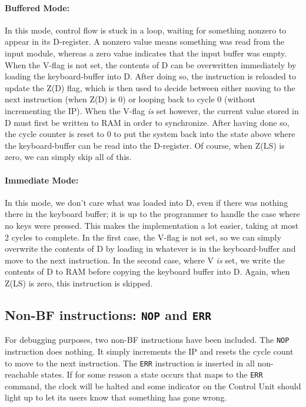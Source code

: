 \paragraph{Buffered Mode:}
In this mode, control flow is stuck in a loop, waiting for something nonzero to appear in its D-register. A nonzero value means something was read from the input module, whereas a zero value indicates that the input buffer was empty. When the V-flag is not set, the contents of D can be overwritten immediately by loading the keyboard-buffer into D. After doing so, the instruction is reloaded to update the Z(D) flag, which is then used to decide between either moving to the next instruction (when Z(D) is 0) or looping back to cycle 0 (without incrementing the IP). When the V-flag \emph{is} set however, the current value stored in D must first be written to RAM in order to synchronize.  After having done so, the cycle counter is reset to 0 to put the system back into the state above where the keyboard-buffer can be read into the D-register. Of course, when Z(LS) is zero, we can simply skip all of this.

\paragraph{Immediate Mode:}
In this mode, we don't care what was loaded into D, even if there was nothing there in the keyboard buffer; it is up to the programmer to handle the case where no keys were pressed. This makes the implementation a lot easier, taking at most 2 cycles to complete. In the first case, the V-flag is not set, so we can simply overwrite the contents of D by loading in whatever is in the keyboard-buffer and move to the next instruction. In the second case, where V \emph{is} set, we write the contents of D to RAM before copying the keyboard buffer into D. Again, when Z(LS) is zero, this instruction is skipped.
  
\subsection{Non-BF instructions: \texttt{NOP} and \texttt{ERR}}
For debugging purposes, two non-BF instructions have been included. The \texttt{NOP} instruction does nothing. It simply increments the IP and resets the cycle count to move to the next instruction. The \texttt{ERR} instruction is inserted in all non-reachable states. If for some reason a state occurs that maps to the \texttt{ERR} command, the clock will be halted and some indicator on the Control Unit should light up to let its users know that something has gone wrong.



